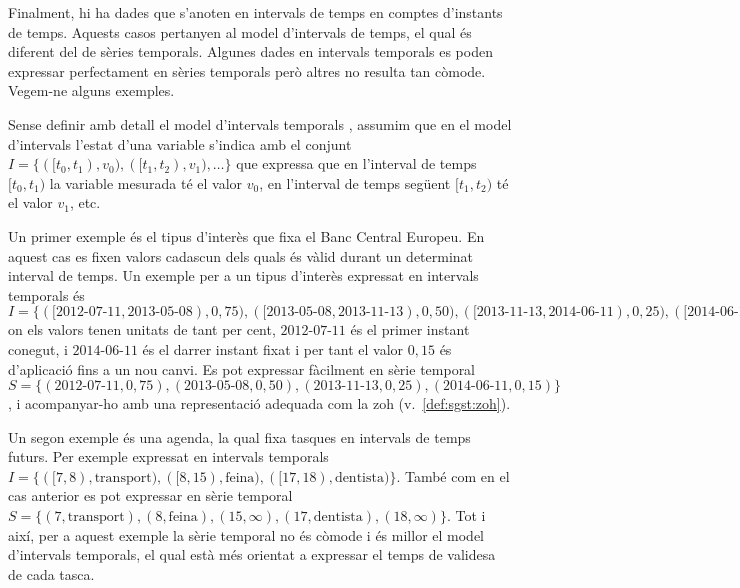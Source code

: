 Finalment, hi ha dades que s'anoten en intervals de temps en comptes
d'instants de temps. Aquests casos pertanyen al model d'intervals de
temps, el qual és diferent del de sèries temporals. Algunes dades en
intervals temporals es poden expressar perfectament en sèries
temporals però altres no resulta tan còmode. Vegem-ne alguns exemples.


Sense definir amb detall el model d'intervals
temporals \parencite{date02:_tempor_data_relat_model}, assumim que en
el model d'intervals l'estat d'una variable s'indica amb el conjunt
$I=\{([t_0,t_1),v_0),([t_1,t_2),v_1),\dotsc\}$ que expressa que en
l'interval de temps $[t_0,t_1)$ la variable mesurada té el valor
$v_0$, en l'interval de temps següent $[t_1,t_2)$ té el valor $v_1$,
etc.






\begin{example}
  \label{ex:sgst:bce}
  Un primer exemple és el tipus d'interès que fixa el Banc Central
  Europeu. En aquest cas es fixen valors cadascun dels quals és vàlid
  durant un determinat interval de temps.  Un exemple per a un tipus
  d'interès expressat en intervals temporals és
  $I=\{([\text{2012-07-11},\text{2013-05-08}),
  0{,}75),([\text{2013-05-08},\text{2013-11-13}),
  0{,}50),([\text{2013-11-13},\text{2014-06-11}),
  0{,}25),([\text{2014-06-11},+\infty), 0{,}15) \}$ on els valors
  tenen unitats de tant per cent, $\text{2012-07-11}$ és el primer
  instant conegut, i $\text{2014-06-11}$ és el darrer instant fixat i
  per tant el valor $0{,}15$ és d'aplicació fins a un nou canvi. Es
  pot expressar fàcilment en sèrie temporal $S=\{(\text{2012-07-11},
  0{,}75),(\text{2013-05-08},0{,}50),(\text{2013-11-13},0{,}25),(\text{2014-06-11},0{,}15)\}$,
  i acompanyar-ho amb una representació adequada com la \gls{zoh}
  (v.~\autoref{def:sgst:zoh}).
\end{example}


\begin{example}
Un segon exemple és una agenda, la qual fixa tasques en intervals de
temps futurs. Per exemple expressat en intervals temporals
$I=\{([7,8),\text{transport}),([8,15),\text{feina}),([17,18),
\text{dentista})\}$. També com en el cas anterior es pot expressar en
sèrie temporal $S=\{(7,\text{transport}),(8,\text{feina}), (15,\infty)
,(17,\text{dentista}), (18,\infty)\}$. Tot i així, per a aquest
exemple la sèrie temporal no és còmode i és millor el model
d'intervals temporals, el qual està més orientat a expressar
el temps de validesa de cada tasca.
\end{example}



